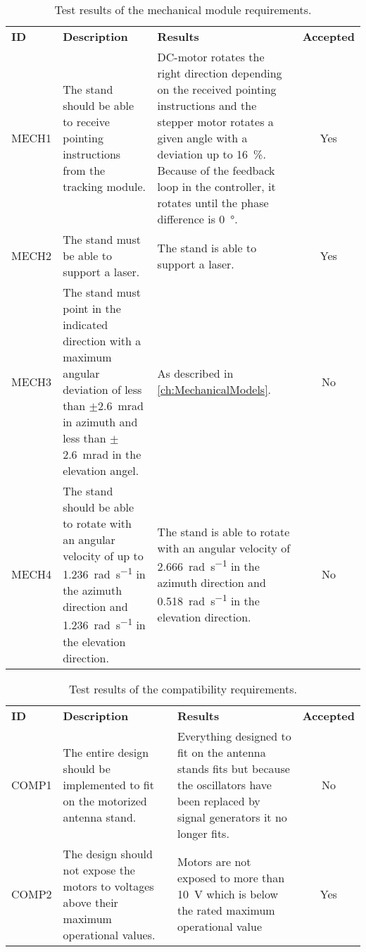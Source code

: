 \begin{table}[h]
	\centering
	\caption{Test results of the mechanical module requirements.}
	\label{tab:ResultMECH}
	\begin{tabularx}{\textwidth}{l X X c}
		\textbf{ID}		&	\textbf{Description} &\textbf{Results} &\textbf{Accepted} \\ \rowcolor{lightGrey} \toprule
MECH1 & The stand should be able to receive pointing instructions from the tracking module. & DC-motor rotates the right direction depending on the received pointing instructions and the stepper motor rotates a given angle with a deviation up to \SI{16}{\percent}. Because of the feedback loop in the controller, it rotates until the phase difference is \SI{0}{\degree}. & Yes \\
MECH2 & The stand must be able to support a laser. & The stand is able to support a laser. & Yes \\ \rowcolor{lightGrey}
MECH3 & The stand must point in the indicated direction with a maximum angular deviation of less than $\pm$\SI{2.6}{\milli\radian} in azimuth and less than $\pm$\SI{2.6}{\milli\radian} in the elevation angel. & As described in \autoref{ch:MechanicalModels}. & No \\
MECH4 & The stand should be able to rotate with an angular velocity of up to \SI{1.236}{\radian\per\second} in the azimuth direction and \SI{1.236}{\radian\per\second} in the elevation direction. & The stand is able to rotate with an angular velocity of \SI{2.666}{\radian\per\second} in the azimuth direction and \SI{0,518}{\radian\per\second} in the elevation direction.  & No \\ 
	\end{tabularx}
\end{table}

\begin{table}[h]
	\centering
	\caption{Test results of the compatibility requirements.}
	\label{tab:ResultCOMP}
	\begin{tabularx}{\textwidth}{l X X c}
		\textbf{ID}		&	\textbf{Description} &\textbf{Results} &\textbf{Accepted} \\ \rowcolor{lightGrey} \toprule
COMP1 & The entire design should be implemented to fit on the motorized antenna stand. & Everything designed to fit on the antenna stands fits but because the oscillators have been replaced by signal generators it no longer fits. & No \\
COMP2 & The design should not expose the motors to voltages above their maximum operational values. & Motors are not exposed to more than \SI{10}{\volt} which is below the rated maximum operational value & Yes
	\end{tabularx}
\end{table} 
\clearpage



